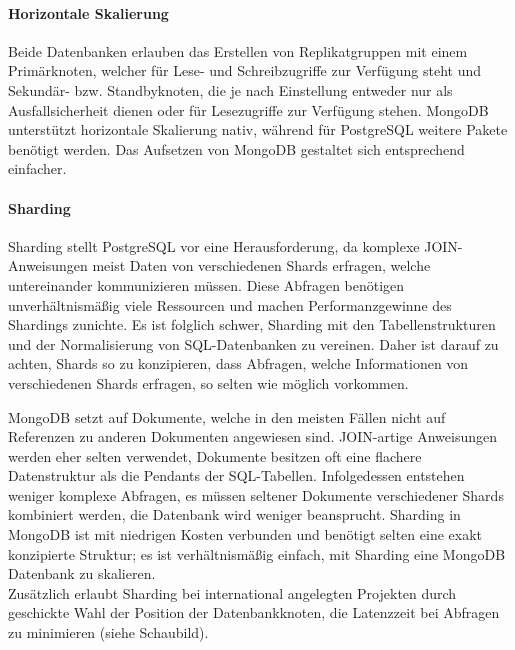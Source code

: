 \paragraph{Horizontale Skalierung\\}
Beide Datenbanken erlauben das Erstellen von Replikatgruppen mit einem Primärknoten, welcher für Lese- und Schreibzugriffe zur Verfügung steht und Sekundär- bzw. Standbyknoten, die je nach Einstellung entweder nur als Ausfallsicherheit dienen oder für Lesezugriffe zur Verfügung stehen. MongoDB unterstützt horizontale Skalierung nativ, während für PostgreSQL weitere Pakete benötigt werden. \cite{MG8} Das Aufsetzen von MongoDB gestaltet sich entsprechend einfacher.

\paragraph{Sharding\\}
Sharding stellt PostgreSQL vor eine Herausforderung, da komplexe JOIN-Anweisungen meist Daten von verschiedenen Shards erfragen, welche untereinander kommunizieren müssen. Diese Abfragen benötigen unverhältnismäßig viele Ressourcen und machen Performanzgewinne des Shardings zunichte. Es ist folglich schwer, Sharding mit den Tabellenstrukturen und der Normalisierung von SQL-Datenbanken zu vereinen. Daher ist darauf zu achten, Shards so zu konzipieren, dass Abfragen, welche Informationen von verschiedenen Shards erfragen, so selten wie möglich vorkommen.

MongoDB setzt auf Dokumente, welche in den meisten Fällen nicht auf Referenzen zu anderen Dokumenten angewiesen sind. JOIN-artige Anweisungen werden eher selten verwendet, Dokumente besitzen oft eine flachere Datenstruktur als die Pendants der SQL-Tabellen. Infolgedessen entstehen weniger komplexe Abfragen, es müssen seltener Dokumente verschiedener Shards kombiniert werden, die Datenbank wird weniger beansprucht. Sharding in MongoDB ist mit niedrigen Kosten verbunden und benötigt selten eine exakt konzipierte Struktur; es ist verhältnismäßig einfach, mit Sharding eine MongoDB Datenbank zu skalieren.\\
Zusätzlich erlaubt Sharding bei international angelegten Projekten durch geschickte Wahl der Position der Datenbankknoten, die Latenzzeit bei Abfragen zu minimieren (siehe Schaubild).

